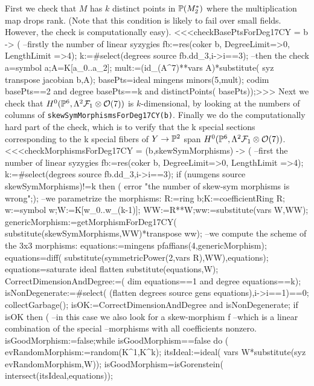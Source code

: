 First we check that $M$ has $k$ distinct points in ${\mathbb P}(M_2^*)$ where 
the multiplication map drops rank. 
(Note that this condition is likely to fail over small fields. 
However, the check is computationally easy).
<<<checkBasePtsForDeg17CY = b -> (
     --firstly the number of linear syzygies
     fb:=res(coker b, DegreeLimit=>0, LengthLimit =>4);
     k:=#select(degrees source fb.dd_3,i->i=={3});
     --then the check
     a=symbol a;A=K[a_0..a_2];
     mult:=(id_(A^7)**vars A)*substitute(
          syz transpose jacobian b,A);
     basePts=ideal mingens minors(5,mult);
     codim basePts==2 and degree basePts==k and distinctPoints(
          basePts));>>>
Next we check that $H^0({\mathbb P}^6,\Lambda^2 {\mathcal F}_1 \otimes {\mathcal O}(7))$ is $k$-dimensional,
by looking at the numbers of columns of {\tt skewSymMorphismsForDeg17CY(b)}.
Finally we do the computationally hard part of the check, which is to
verify that the k special sections corresponding to the k special
fibers of $Y \to {\mathbb P}^2$ span $H^0({\mathbb P}^6,\Lambda^2 {\mathcal F}_1 \otimes {\mathcal O}(7))$.
<<<checkMorphismsForDeg17CY = (b,skewSymMorphisms) -> (
     --first the number of linear syzygies
     fb:=res(coker b, DegreeLimit=>0, LengthLimit =>4);
     k:=#select(degrees source fb.dd_3,i->i=={3});
     if (numgens source skewSymMorphisms)!=k then (
          error "the number of skew-sym morphisms is wrong";);
     --we parametrize the morphisms:
     R:=ring b;K:=coefficientRing R;
     w:=symbol w;W:=K[w_0..w_(k-1)];
     WW:=R**W;ww:=substitute(vars W,WW);
     genericMorphism:=getMorphismForDeg17CY(
          substitute(skewSymMorphisms,WW)*transpose ww);
     --we compute the scheme of the 3x3 morphisms:
     equations:=mingens pfaffians(4,genericMorphism);
     equations=diff(
          substitute(symmetricPower(2,vars R),WW),equations);
     equations=saturate ideal flatten substitute(equations,W);
     CorrectDimensionAndDegree:=(
          dim equations==1 and degree equations==k);
     isNonDegenerate:=#select(
          (flatten degrees source gens equations),i->i==1)==0;
     collectGarbage();
     isOK:=CorrectDimensionAndDegree and isNonDegenerate;
     if isOK then (
          --in this case we also look for a skew-morphism f 
          --which is a linear combination of the special 
          --morphisms with all coefficients nonzero.
          isGoodMorphism:=false;while isGoodMorphism==false do (
               evRandomMorphism:=random(K^1,K^k);
               itsIdeal:=ideal(
                    vars W*substitute(syz evRandomMorphism,W));
               isGoodMorphism=isGorenstein(
                    intersect(itsIdeal,equations));

